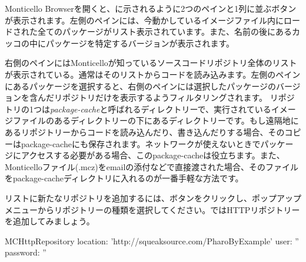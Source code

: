\documentclass[a4paper,10pt,twoside]{book}
\begin{document}
Monticello Browserを開くと、に示されるように2つのペインと1列に並ぶボタンが表示されます。左側のペインには、今動かしているイメージファイル内にロードされた全てのパッケージがリスト表示されています。また、名前の後にあるカッコの中にパッケージを特定するバージョンが表示されます。

右側のペインにはMonticelloが知っているソースコードリポジトリ全体のリストが表示されている。通常はそのリストからコードを読み込みます。左側のペインにあるパッケージを選択すると、右側のペインには選択したパッケージのバージョンを含んだリポジトリだけを表示するようフィルタリングされます。
リポジトリの1つは\emph{package-cache}と呼ばれるディレクトリーで、実行されているイメージファイルのあるディレクトリーの下にあるディレクトリーです。もし遠隔地にあるリポジトリーからコードを読み込んだり、書き込んだりする場合、そのコピーはpackage-cacheにも保存されます。ネットワークが使えないときでパッケージにアクセスする必要がある場合、このpackage-cacheは役立ちます。また、Monticelloファイル(.mcz)をemailの添付などで直接渡された場合、そのファイルをpackage-cacheディレクトリに入れるのが一番手軽な方法です。

リストに新たなリポジトリを追加するには、ボタンをクリックし、ポップアップメニューからリポジトリーの種類を選択してください。ではHTTPリポジトリーを追加してみましょう。

\begin{code}{}
MCHttpRepository
	location: 'http://squeaksource.com/PharoByExample'
	user: ''
	password: ''
\end{code}
\end{document}
